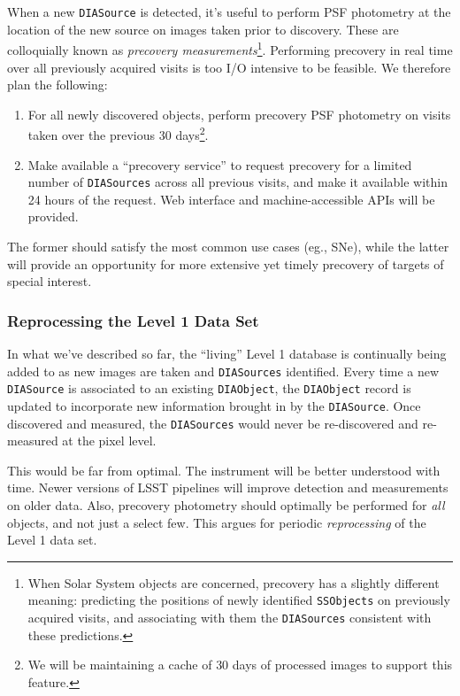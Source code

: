 \documentclass[12pt]{article}
\newcommand{\code}[1]{\texttt{#1}}
\newcommand{\DIASource}{\code{DIASource}\xspace}
\newcommand{\DIASources}{\code{DIASources}\xspace}
\newcommand{\DIAObject}{\code{DIAObject}\xspace}
\newcommand{\DB}{{Level 1 database}\xspace}
\newcommand{\SSObjects}{\code{SSObjects}\xspace}
\begin{document}
When a new \DIASource is detected, it's useful to perform PSF photometry at the location of the new source on images taken prior to discovery. These are colloquially known as {\em precovery measurements}\footnote{When Solar System objects are concerned, precovery has a slightly different meaning: predicting the positions of newly identified \SSObjects on previously acquired visits, and associating with them the \DIASources consistent with these predictions.}. Performing precovery in real time over all previously acquired visits is too I/O intensive to be feasible. We therefore plan the following:
\begin{enumerate}
\item For all newly discovered objects, perform precovery PSF photometry on visits taken over the previous 30 days\footnote{We will be maintaining a cache of $30$ days of processed images to support this feature.}.
\item Make available a ``precovery service'' to request precovery for a limited number of \DIASources across all previous visits, and make it available within 24 hours of the request. Web interface and machine-accessible APIs will be provided.
\end{enumerate}

The former should satisfy the most common use cases (eg., SNe), while the latter will provide an opportunity for more extensive yet timely precovery of targets of special interest.

\subsubsection{Reprocessing the Level 1 Data Set}
\label{sec:l1dbreproc}

In what we've described so far, the ``living'' \DB is continually being added to as new images are taken and \DIASources identified. Every time a new \DIASource is associated to an existing \DIAObject, the \DIAObject record is updated to incorporate new information brought in by the \DIASource. Once discovered and measured, the \DIASources would never be re-discovered and re-measured at the pixel level.

This would be far from optimal. The instrument will be better understood with time. Newer versions of LSST pipelines will improve detection and measurements on older data. Also, precovery photometry should optimally be performed for {\em all} objects, and not just a select few. This argues for periodic {\em reprocessing} of the Level 1 data set.
\end{document}
